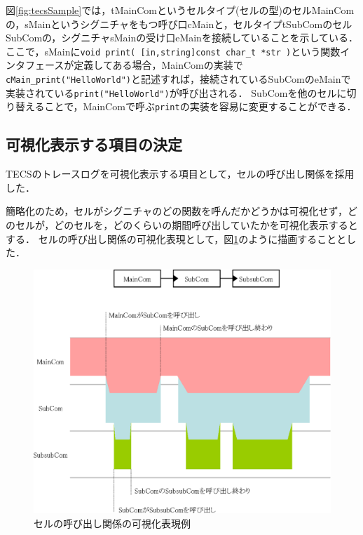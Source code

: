 図\ref{fig:tecsSample}では，tMainComというセルタイプ(セルの型)のセルMainComの，sMainというシグニチャをもつ呼び口cMainと，セルタイプtSubComのセルSubComの，シグニチャsMainの受け口eMainを接続していることを示している．
ここで，sMainに{\tt void print( [in,string]const char\_t *str )}という関数インタフェースが定義してある場合，MainComの実装で{\tt cMain\_print("HelloWorld")}と記述すれば，接続されているSubComのeMainで実装されている{\tt print("HelloWorld")}が呼び出される．
SubComを他のセルに切り替えることで，MainComで呼ぶ{\tt print}の実装を容易に変更することができる．

\subsection{可視化表示する項目の決定}
\label{subsec431}

TECSのトレースログを可視化表示する項目として，セルの呼び出し関係を採用した．

簡略化のため，セルがシグニチャのどの関数を呼んだかどうかは可視化せず，どのセルが，どのセルを，どのくらいの期間呼び出していたかを可視化表示するとする．
セルの呼び出し関係の可視化表現として，図\ref{fig:tecsVisualize}のように描画することとした．

\begin{figure}[t]
\begin{center}
\includegraphics[scale=0.8]{img/tecsVisualize.eps}
\caption{セルの呼び出し関係の可視化表現例}
\label{fig:tecsVisualize}
\end{center}
\end{figure}

